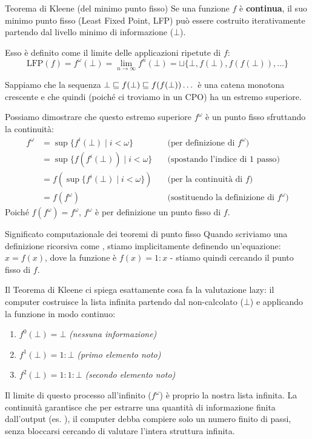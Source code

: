 \begin{defframe}{Teorema di Kleene (del minimo punto fisso)}{}
    Se una funzione $f$ è \textbf{continua}, il suo minimo punto fisso (Least Fixed Point, LFP) può essere costruito iterativamente partendo dal livello minimo di informazione ($\bot$).
    
    Esso è definito come il limite delle applicazioni ripetute di $f$:
    \[ \text{LFP}(f) = f^\omega(\bot) = \lim_{n\to\infty} f^n(\bot) = \sqcup \{ \bot, f(\bot), f(f(\bot)), \dots \} \]
    \begin{proofframe}
    Sappiamo che la sequenza $\bot \sqsubseteq f(\bot) \sqsubseteq f(f(\bot)) \dots$ è una catena monotona crescente e che quindi (poiché ci troviamo in un CPO) ha un estremo superiore.

    Possiamo dimostrare che questo estremo superiore $f^\omega$ è un punto fisso sfruttando la continuità:
    \begin{align*}
        f^\omega &= \sup \{ f^i(\bot) \mid i < \omega \} \quad &\text{(per definizione di } f^\omega \text{)} \\
        &= \sup \{ f(f^i(\bot)) \mid i < \omega \} \quad &\text{(spostando l'indice di 1 passo)} \\
        &= f(\sup \{ f^i(\bot) \mid i < \omega \}) \quad &\text{(per la continuità di } f\text{)} \\
        &= f(f^\omega) \quad &\text{(sostituendo la definizione di } f^\omega\text{)}
    \end{align*}
    Poiché $f(f^\omega) = f^\omega$, $f^\omega$ è per definizione un punto fisso di $f$.
    \end{proofframe}
\end{defframe}

\begin{gframe}{Significato computazionale dei teoremi di punto fisso}
Quando scriviamo una definizione ricorsiva come , stiamo implicitamente definendo un'equazione: $x = f(x)$, dove la funzione è $f(x) = 1 : x$ - stiamo quindi cercando il punto fisso di $f$.

Il Teorema di Kleene ci spiega esattamente cosa fa la valutazione lazy: il computer costruisce la lista infinita partendo dal non-calcolato ($\bot$) e applicando la funzione in modo continuo:
\begin{enumerate}
    \item $f^0(\bot) = \bot$ \hfill \textit{(nessuna informazione)}
    \item $f^1(\bot) = 1 : \bot$ \hfill \textit{(primo elemento noto)}
    \item $f^2(\bot) = 1 : 1 : \bot$ \hfill \textit{(secondo elemento noto)}
\end{enumerate}
Il limite di questo processo all'infinito ($f^\omega$) è proprio la nostra lista infinita. La continuità garantisce che per estrarre una quantità di informazione finita dall'output (es. ), il computer debba compiere solo un numero finito di passi, senza bloccarsi cercando di valutare l'intera struttura infinita.
\end{gframe}

